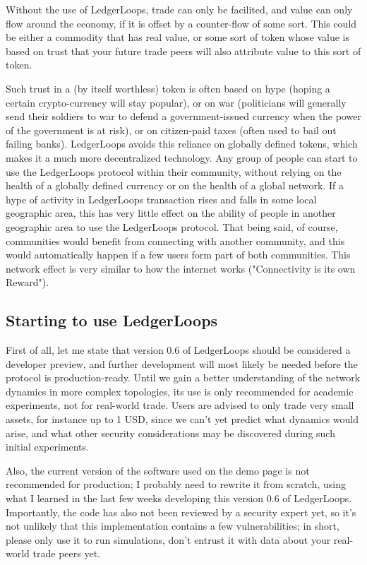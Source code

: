 \documentclass[11pt,twoside,a4paper]{article}
\begin{document}
Without the use of LedgerLoops, trade can only be facilited, and value can only flow around the economy, if it is offset by a counter-flow of some sort. This could be either a commodity that has real value, or some sort of token whose value is based on trust that your future trade peers will also attribute value to this sort of token.

Such trust in a (by itself worthless) token is often based on hype (hoping a certain crypto-currency will stay popular), or on war (politicians will generally send their soldiers to war to defend a government-issued currency when the power of the government is at risk), or on citizen-paid taxes (often used to bail out failing banks). LedgerLoops avoids this reliance on globally defined tokens, which makes it a much more decentralized technology. Any group of people can start to use the LedgerLoops protocol within their community, without relying on the health of a globally defined currency or on the health of a global network. If a hype of activity in LedgerLoops transaction rises and falls in some local geographic area, this has very little effect on the ability of people in another geographic area to use the LedgerLoops protocol. That being said, of course, communities would benefit from connecting with another community, and this would automatically happen if a few users form part of both communities. This network effect is very similar to how the internet works ("Connectivity is its own Reward").

\subsection{Starting to use LedgerLoops}
First of all, let me state that version 0.6 of LedgerLoops should be considered a developer preview, and further development will most likely be needed before the protocol is production-ready. Until we gain a better understanding of the network dynamics in more complex topologies, its use is only recommended for academic experiments, not for real-world trade. Users are advised to only trade very small assets, for instance up to 1 USD, since we can't yet predict what dynamics would arise, and what other security considerations may be discovered during such initial experiments.

Also, the current version of the software used on the demo page is not recommended for production; I probably need to rewrite it from scratch, using what I learned in the last few weeks developing this version 0.6 of LedgerLoops. Importantly, the code has also not been reviewed by a security expert yet, so it's not unlikely that this implementation contains a few vulnerabilities; in short, please only use it to run simulations, don't entrust it with data about your real-world trade peers yet.
\end{document}
